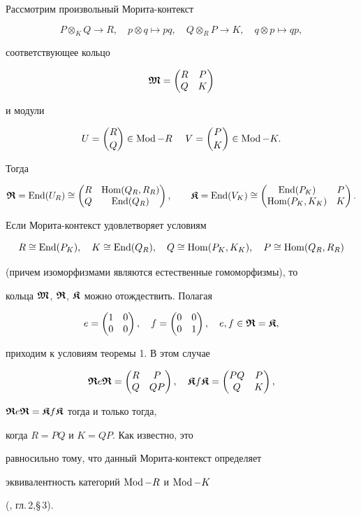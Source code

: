 \begin{exam} Рассмотрим произвольный Морита-контекст


$$P \otimes_{K}Q \to R ,\quad p \otimes q \mapsto pq,\quad


Q \otimes_{R}P \to K ,\quad q \otimes p \mapsto qp,


$$


соответствующее кольцо


$$


\M=\mat{R}{P}{Q}{K}


$$


и модули


$$


U=\colmn{R}{Q} \in \Mod -R \quad \ V=\colmn{P}{K} \in \Mod -K.


$$


Тогда


$$


\R=\End(U_R) \cong \mat{R}{\Hom(Q_R,R_R)}{Q}{\End(Q_R)},\qquad


\K=\End(V_K) \cong \mat{\End(P_K)}{P}{\Hom(P_K,K_K)}{K}.


$$





Если Морита-контекст удовлетворяет условиям


$$


R \cong \End(P_K),\quad K \cong \End (Q_R),\quad


Q \cong \Hom (P_K,K_K),\quad P \cong \Hom ( Q_R ,R_R)


$$


(причем изоморфизмами являются естественные гомоморфизмы), то


кольца $\boldsymbol{\frak M}$, $\boldsymbol{\frak R}$, $\boldsymbol{\frak K}$ можно отождествить. Полагая


$$


e=\mat{1}{0}{0}{0},\quad f=\mat{0}{0}{0}{1}, \quad e,f \in \R = \K,


$$


приходим к условиям теоремы 1. В этом случае


$$


\R e \R = \mat{R}{P}{Q}{QP},\quad \K f \K =\mat{PQ}{P}{Q}{K},


$$


$\boldsymbol{\frak R} e \boldsymbol{\frak R} = \boldsymbol{\frak K} f \boldsymbol{\frak K} $ тогда и только тогда,


когда $R=PQ $ и $K=QP$. Как известно, это


равносильно тому, что данный Морита-контекст определяет


эквивалентность категорий $\operatorname{Mod} -R $ и $ \operatorname{Mod} -K $


(\cite{Bass}, гл.\,2,\S\,3).


\end{exam}


